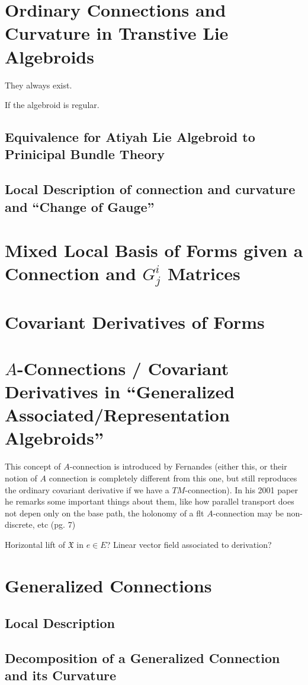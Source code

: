 
\section{Ordinary Connections and Curvature in Transtive Lie Algebroids}

They always exist.

If the algebroid is regular.

\subsection{Equivalence for Atiyah Lie Algebroid to Prinicipal Bundle Theory}
\subsection{Local Description of connection and curvature and ``Change of Gauge''}

\section{Mixed Local Basis of Forms given a Connection and $G^i_j$ Matrices}

\section{Covariant Derivatives of Forms}

\section{$A$-Connections / Covariant Derivatives in ``Generalized Associated/Representation Algebroids''}

This concept of $A$-connection is introduced by Fernandes (either this, or their notion of $A$ connection is completely different from this one, but still reproduces the ordinary covariant derivative if we have a $TM$-connection). In his 2001 paper he remarks some important things about them, like how parallel transport does not depen only on the base path, the holonomy of a flt $A$-connection may be non-discrete, etc (pg. 7)

Horizontal lift of $\mathfrak{X}$ in $e\in E$? Linear vector field associated to derivation?


\section{Generalized Connections}
\subsection{Local Description}
\subsection{Decomposition of a Generalized Connection and its Curvature}

